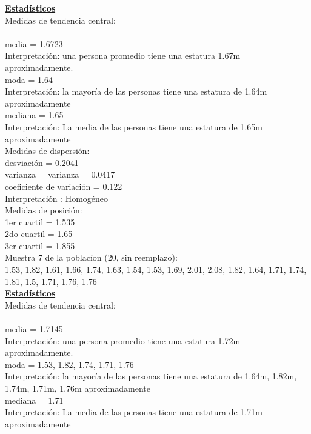 \documentclass[a4paper,12pt]{article}
\begin{document}
\begin{enumerate}
\textbf{\underline{Estad\'isticos}}\\

Medidas de tendencia central:\\\\
media = 1.6723\\
Interpretaci\'on: una persona promedio tiene una estatura 1.67m aproximadamente.\\
moda =  1.64\\
Interpretaci\'on: la mayor\'ia de las personas tiene una estatura de 1.64m aproximadamente\\
mediana =  1.65\\
Interpretaci\'on: La media de las personas tiene una estatura de 1.65m aproximadamente\\

Medidas de dispersi\'on:\\
desviaci\'on = 0.2041\\
varianza = varianza = 0.0417\\
coeficiente de variaci\'on = 0.122\\
Interpretaci\'on : Homog\'eneo\\

Medidas de posici\'on:\\
1er cuartil = 1.535\\
2do cuartil = 1.65\\
3er cuartil = 1.855\\

Muestra 7 de la poblac\'ion (20, sin reemplazo):\\

1.53,	1.82,	1.61,	1.66,	1.74,	1.63,
1.54,	1.53,	1.69,	2.01,	2.08,	1.82,
1.64,	1.71,	1.74,	1.81,	1.5,    1.71,
1.76,	1.76\\

\textbf{\underline{Estad\'isticos}}\\

Medidas de tendencia central:\\\\
media = 1.7145\\
Interpretaci\'on: una persona promedio tiene una estatura 1.72m aproximadamente.\\
moda = 1.53, 1.82, 1.74, 1.71, 1.76\\
Interpretaci\'on: la mayor\'ia de las personas tiene una estatura de 1.64m, 1.82m, 1.74m, 1.71m, 1.76m aproximadamente\\
mediana = 1.71\\
Interpretaci\'on: La media de las personas tiene una estatura de 1.71m aproximadamente\\


\end{enumerate}
\end{document}
